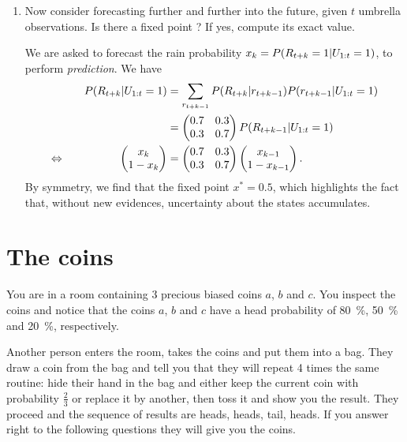 \documentclass[11pt, a4paper]{article}
\begin{document}
\begin{enumerate}
    \item Now consider forecasting further and further into the future, given $t$ umbrella observations. Is there a fixed point ? If yes, compute its exact value.
    
    \begin{solution}
        We are asked to forecast the rain probability $x_k = P(R_{t + k} = 1 \vert U_{1:t} = 1)$, \ie{} to perform \emph{prediction}. We have
        \begin{alignat*}{2}
            && P(R_{t+k} \vert U_{1:t} = 1) & = \sum_{r_{t+k-1}} P(R_{t+k} \vert r_{t+k-1}) P(r_{t+k-1} \vert U_{1:t} = 1) \\
            &&& = \begin{pmatrix}0.7 & 0.3 \\ 0.3 & 0.7\end{pmatrix} P(R_{t+k-1} \vert U_{1:t} = 1) \\
            \Leftrightarrow \quad && \begin{pmatrix}x_k \\ 1 - x_k\end{pmatrix} & = \begin{pmatrix}0.7 & 0.3 \\ 0.3 & 0.7\end{pmatrix} \begin{pmatrix}x_{k - 1} \\ 1 - x_{k - 1}\end{pmatrix} .
        \end{alignat*}
        By symmetry, we find that the fixed point $x^* = 0.5$, which highlights the fact that, without new evidences, uncertainty about the states accumulates.
    \end{solution}
\end{enumerate}

\newpage

\section{The coins}

You are in a room containing 3 precious biased coins $a$, $b$ and $c$. You inspect the coins and notice that the coins $a$, $b$ and $c$ have a head probability of \SI{80}{\percent}, \SI{50}{\percent} and \SI{20}{\percent}, respectively.

Another person enters the room, takes the coins and put them into a bag. They draw a coin from the bag and tell you that they will repeat 4 times the same routine: hide their hand in the bag and either keep the current coin with probability $\frac{2}{3}$ or replace it by another, then toss it and show you the result. They proceed and the sequence of results are heads, heads, tail, heads. If you answer right to the following questions they will give you the coins.
\end{document}
